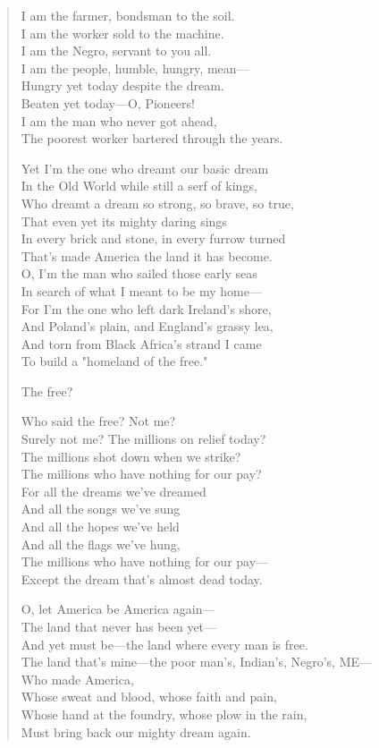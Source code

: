 \documentclass[12pt, openany, letterpaper]{memoir}
\begin{document}
\begin{verse}
	\newpage
	I am the farmer, bondsman to the soil.\\
	I am the worker sold to the machine.\\
	I am the Negro, servant to you all.\\
	I am the people, humble, hungry, mean—\\
	Hungry yet today despite the dream.\\
	Beaten yet today—O, Pioneers!\\
	I am the man who never got ahead,\\
	The poorest worker bartered through the years.
	
	Yet I'm the one who dreamt our basic dream\\
	In the Old World while still a serf of kings,\\
	Who dreamt a dream so strong, so brave, so true,\\
	That even yet its mighty daring sings\\
	In every brick and stone, in every furrow turned\\
	That's made America the land it has become.\\
	O, I'm the man who sailed those early seas\\
	In search of what I meant to be my home—\\
	For I'm the one who left dark Ireland's shore,\\
	And Poland's plain, and England's grassy lea,\\
	And torn from Black Africa's strand I came\\
	To build a "homeland of the free."
	
	The free?
	
	Who said the free?  Not me?\\
	Surely not me?  The millions on relief today?\\
	The millions shot down when we strike?\\
	The millions who have nothing for our pay?\\
	For all the dreams we've dreamed\\
	And all the songs we've sung\\
	And all the hopes we've held\\
	And all the flags we've hung,\\
	The millions who have nothing for our pay—\\
	Except the dream that's almost dead today.
	
	\newpage
	O, let America be America again—\\
	The land that never has been yet—\\
	And yet must be—the land where every man is free.\\
	The land that's mine—the poor man's, Indian's, Negro's, ME—\\
	Who made America,\\
	Whose sweat and blood, whose faith and pain,\\
	Whose hand at the foundry, whose plow in the rain,\\
	Must bring back our mighty dream again.
	

\end{verse}
\end{document}
